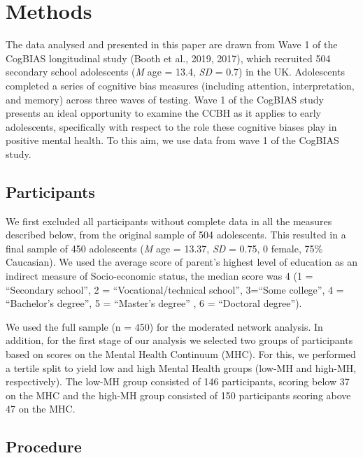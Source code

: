 \documentclass[
  english,
  man,floatsintext]{apa6}
\begin{document}
\hypertarget{methods}{%
\section{Methods}\label{methods}}

The data analysed and presented in this paper are drawn from Wave 1 of the CogBIAS longitudinal study (Booth et al., 2019, 2017), which recruited 504 secondary school adolescents (\emph{M} age = 13.4, \emph{SD} = 0.7) in the UK. Adolescents completed a series of cognitive bias measures (including attention, interpretation, and memory) across three waves of testing. Wave 1 of the CogBIAS study presents an ideal opportunity to examine the CCBH as it applies to early adolescents, specifically with respect to the role these cognitive biases play in positive mental health. To this aim, we use data from wave 1 of the CogBIAS study.

\hypertarget{participants}{%
\subsection{Participants}\label{participants}}

We first excluded all participants without complete data in all the measures described below, from the original sample of 504 adolescents. This resulted in a final sample of 450 adolescents (\emph{M} age = 13.37, \emph{SD} = 0.75, 0 female, 75\% Caucasian). We used the average score of parent's highest level of education as an indirect measure of Socio-economic status, the median score was 4 (1 = \enquote{Secondary school}, 2 = \enquote{Vocational/technical school}, 3=\enquote{Some college}, 4 = \enquote{Bachelor's degree}, 5 = \enquote{Master's degree} , 6 = \enquote{Doctoral degree}).

We used the full sample (n = 450) for the moderated network analysis. In addition, for the first stage of our analysis we selected two groups of participants based on scores on the Mental Health Continuum (MHC). For this, we performed a tertile split to yield low and high Mental Health groups (low-MH and high-MH, respectively). The low-MH group consisted of 146 participants, scoring below 37 on the MHC and the high-MH group consisted of 150 participants scoring above 47 on the MHC.

\hypertarget{procedure}{%
\subsection{Procedure}\label{procedure}}
\end{document}
